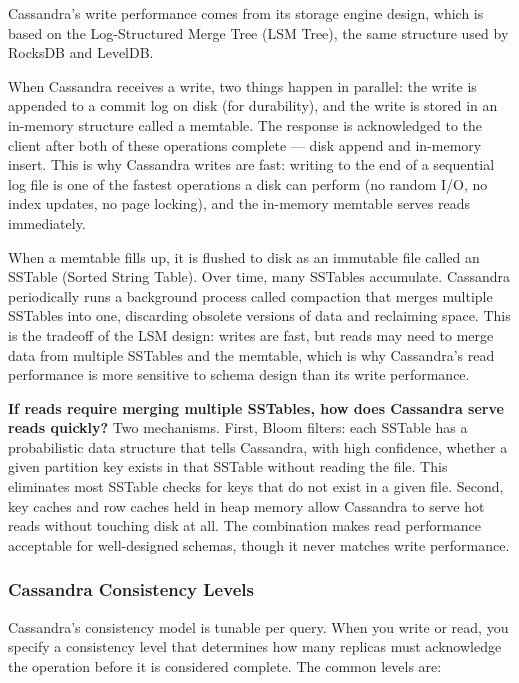 \documentclass[11pt,a4paper]{article}
\begin{document}
Cassandra's write performance comes from its storage engine design, which is based on the Log-Structured Merge Tree (LSM Tree), the same structure used by RocksDB and LevelDB.

When Cassandra receives a write, two things happen in parallel: the write is appended to a commit log on disk (for durability), and the write is stored in an in-memory structure called a memtable. The response is acknowledged to the client after both of these operations complete --- disk append and in-memory insert. This is why Cassandra writes are fast: writing to the end of a sequential log file is one of the fastest operations a disk can perform (no random I/O, no index updates, no page locking), and the in-memory memtable serves reads immediately.

When a memtable fills up, it is flushed to disk as an immutable file called an SSTable (Sorted String Table). Over time, many SSTables accumulate. Cassandra periodically runs a background process called compaction that merges multiple SSTables into one, discarding obsolete versions of data and reclaiming space. This is the tradeoff of the LSM design: writes are fast, but reads may need to merge data from multiple SSTables and the memtable, which is why Cassandra's read performance is more sensitive to schema design than its write performance.

\begin{thinkbox}
\textbf{If reads require merging multiple SSTables, how does Cassandra serve reads quickly?} Two mechanisms. First, Bloom filters: each SSTable has a probabilistic data structure that tells Cassandra, with high confidence, whether a given partition key exists in that SSTable without reading the file. This eliminates most SSTable checks for keys that do not exist in a given file. Second, key caches and row caches held in heap memory allow Cassandra to serve hot reads without touching disk at all. The combination makes read performance acceptable for well-designed schemas, though it never matches write performance.
\end{thinkbox}

\subsubsection{Cassandra Consistency Levels}

Cassandra's consistency model is tunable per query. When you write or read, you specify a consistency level that determines how many replicas must acknowledge the operation before it is considered complete. The common levels are:
\end{document}
